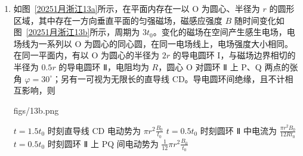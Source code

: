 \documentclass[\gkver]{gaokaozhenti}
\begin{document}
\begin{enumerate}
{即此时刻左侧波在该点的振动在平衡位置向上运动，右侧波在该点的振动也在平衡位置向下振动，可知该点的振动减弱，选项 C 正确；

D．当右侧波传到 $x = 6 \Um$ 位置时用时间为 $0.1 \Us = 5T$，即此时 $x = 6 \Um$ 处质点从平衡位置向上振动；

此时 $x = 0$ 处的波源 $S_{1}$ 也在平衡位置向上振动，即振动方向相同，可知在 $0 < x < 6 \Um$ 内到 $x = 0$ 和 $x = 6 \Um$ 两点的路程差为波长整数倍时振动加强，波在该区间内的波长 $\lambda_{1} = v_{1}T = 40 \times 0.02 \Um = 0.8 \Um$

可知 $x - (6 - x) = n\lambda = 0.8n$

即 $x = 3 + 0.4n$

其中 $n$ 取 0、$\pm 1$、$\pm 2$、$\pm 3$、$\pm 4$、$\pm 5$、$\pm 6$、$\pm 7$

则共有 15 个振动加强点，选项 D 错误。

故选 BC。
}

\item
如图~\ref{20251月浙江13a}所示，在平面内存在一以 O 为圆心、半径为 $r$ 的圆形区域，其中存在一方向垂直平面的匀强磁场，磁感应强度 $B$ 随时间变化如图~\ref{20251月浙江13b}所示，周期为 $3t_{0}$。变化的磁场在空间产生感生电场，电场线为一系列以 O 为圆心的同心圆，在同一电场线上，电场强度大小相同。在同一平面内，有以 O 为圆心的半径为 $2r$ 的导电圆环 I，与磁场边界相切的半径为 $0.5r$ 的导电圆环 Ⅱ，电阻均为 $R$，圆心 O 对圆环 Ⅱ 上 P、Q 两点的张角 $\varphi = 30^{\circ}$；另有一可视为无限长的直导线 CD。导电圆环间绝缘，且不计相互影响，则

{figs/13b.png}

{$t = 1.5t_{0}$ 时刻直导线 CD 电动势为 $\pi r^{2}\frac{B_{0}}{t_{0}}$}
{$t = 0.5t_{0}$ 时刻圆环 Ⅱ 中电流为 $\frac{\pi r^{2}B_{0}}{12Rt_{0}}$}
{$t = 0.5t_{0}$ 时刻圆环 Ⅱ 上 PQ 间电动势为 $\frac{1}{12}\pi r^{2}\frac{B_{0}}{t_{0}}$}

\end{enumerate}
\end{document}
